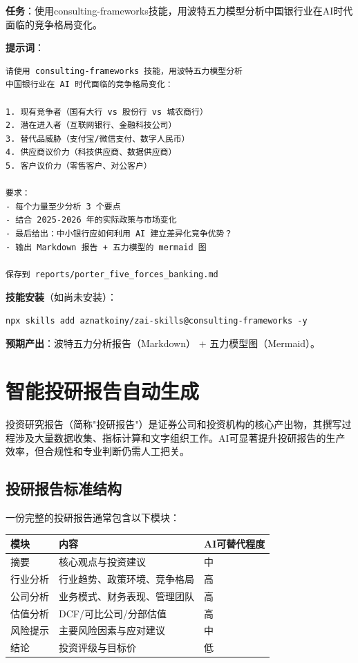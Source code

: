 \begin{practicebox}
\textbf{任务}：使用consulting-frameworks技能，用波特五力模型分析中国银行业在AI时代面临的竞争格局变化。

\textbf{提示词}：

\begin{lstlisting}
请使用 consulting-frameworks 技能，用波特五力模型分析
中国银行业在 AI 时代面临的竞争格局变化：

1. 现有竞争者（国有大行 vs 股份行 vs 城农商行）
2. 潜在进入者（互联网银行、金融科技公司）
3. 替代品威胁（支付宝/微信支付、数字人民币）
4. 供应商议价力（科技供应商、数据供应商）
5. 客户议价力（零售客户、对公客户）

要求：
- 每个力量至少分析 3 个要点
- 结合 2025-2026 年的实际政策与市场变化
- 最后给出：中小银行应如何利用 AI 建立差异化竞争优势？
- 输出 Markdown 报告 + 五力模型的 mermaid 图

保存到 reports/porter_five_forces_banking.md
\end{lstlisting}

\textbf{技能安装}（如尚未安装）：

\begin{lstlisting}[style=shell]
npx skills add aznatkoiny/zai-skills@consulting-frameworks -y
\end{lstlisting}

\textbf{预期产出}：波特五力分析报告（Markdown） + 五力模型图（Mermaid）。
\end{practicebox}

\section{智能投研报告自动生成}

投资研究报告（简称"投研报告"）是证券公司和投资机构的核心产出物，其撰写过程涉及大量数据收集、指标计算和文字组织工作。AI可显著提升投研报告的生产效率，但合规性和专业判断仍需人工把关。

\subsection{投研报告标准结构}

一份完整的投研报告通常包含以下模块：

\begin{table}[H]
\centering
\begin{tabular}{llp{5cm}}
\toprule
\textbf{模块} & \textbf{内容} & \textbf{AI可替代程度} \\
\midrule
摘要 & 核心观点与投资建议 & 中 \\
行业分析 & 行业趋势、政策环境、竞争格局 & 高 \\
公司分析 & 业务模式、财务表现、管理团队 & 高 \\
估值分析 & DCF/可比公司/分部估值 & 高 \\
风险提示 & 主要风险因素与应对建议 & 中 \\
结论 & 投资评级与目标价 & 低 \\
\bottomrule
\end{tabular}
\end{table}

